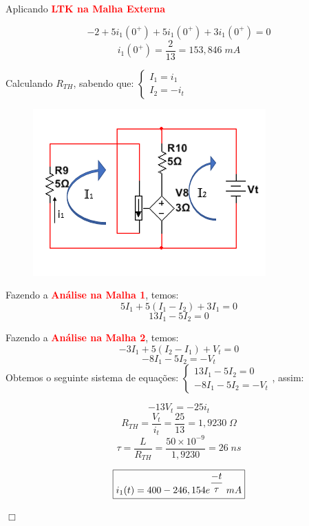\documentclass[
	12pt,				%
	oneside,			%
	a4paper,			%
	english,			%
	french,				%
	spanish,			%
	brazil				%
	]{abntex2}
\begin{document}
\newpage

Aplicando \textbf{\textcolor{red}{LTK na Malha Externa}}

$$-2+5i_1(0^+)+5i_1(0^+)+3i_1(0^+)=0$$
$$i_1(0^+)=\dfrac{2}{13}=153,846\;mA$$

Calculando $R_{TH}$, sabendo que:
$\begin{cases}
    I_1=i_1\\
    I_2=-i_t
\end{cases}$

\begin{figure}[htb]
	\centering
	\includegraphics[scale=0.8]{Circuito_2-17(d).PNG}
\end{figure}

Fazendo a \textbf{\textcolor{red}{Análise na Malha 1}}, temos:
$$5I_1+5(I_1-I_2)+3I_1=0$$
$$13I_1-5I_2=0$$

Fazendo a \textbf{\textcolor{red}{Análise na Malha 2}}, temos:
$$-3I_1+5(I_2-I_1)+V_t=0$$
$$-8I_1-5I_2=-V_t$$
Obtemos o seguinte sistema de equações:
$\begin{cases}
    13I_1 - 5I_2= 0 \\
    -8I_1 - 5I_2= -V_t
\end{cases}$, assim: 

$$-13V_t=-25i_t$$
$$R_{TH}=\dfrac{V_t}{i_t}=\dfrac{25}{13}=1,9230\;\Omega$$
$$\tau=\dfrac{L}{R_{TH}}=\dfrac{50\times10^{-9}}{1,9230}=26\;ns$$

\begin{equation}
    \centering
    \fbox{$i_1(t)=400-246,154e^{\dfrac{-t}{\tau}} \;mA$}
\end{equation}

\begin{flushright}
    $\Box$
\end{flushright}
\newpage

\end{document}
